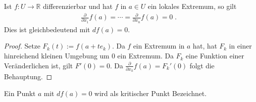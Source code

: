 \begin{Satz}
 Ist $f: U  \to \mathbb{R}$ differenzierbar und hat  $f$ in $a \in U$ ein lokales Extremum, so gilt 
\begin{align*}
\frac{\partial}{\partial x_{1}}f(a)  = \cdots  = \frac{\partial}{\partial x_{n}} f(a) = 0 \;.
\end{align*}
Dies ist gleichbedeutend mit $df(a) = 0$.
\end{Satz}
\begin{proof}
Setze $F_k(t) := f(a + t e_k)$. Da $f$ ein Extremum in $a$ hat, hat $F_k$ in einer hinreichend kleinen Umgebung um $0$ ein Extremum. 
Da $F_k$ eine Funktion einer Veränderlichen ist, gilt $F'(0) = 0$. Da $\frac{\partial}{\partial x_k} f(a) = F_k'(0)$ folgt die Behauptung.
\end{proof}

\begin{Definition}
Ein Punkt $a$ mit $df(a) = 0$ wird als kritischer Punkt Bezeichnet. 
\end{Definition}

